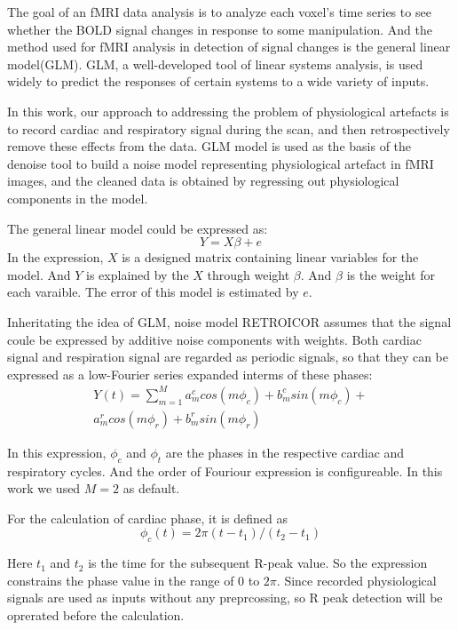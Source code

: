 The goal of an fMRI data analysis is to analyze each voxel's time series to see whether the BOLD signal changes in response to some manipulation.\cite{poldrack2011handbook} 
And the method used for fMRI analysis in detection of signal changes is the general linear model(GLM). 
GLM, a well-developed tool of linear systems analysis, is used widely to predict the responses of certain systems to a wide variety of inputs.\cite{cohen1997parametric}

In this work, our approach to addressing the problem of physiological artefacts is to record cardiac and respiratory signal during the scan, and then retrospectively remove these effects from the data.\cite{glover2000image} 
GLM model is used as the basis of the denoise tool to build a noise model representing physiological artefact in fMRI images, and the cleaned data is obtained by regressing out physiological components in the model.

The general linear model could be expressed as:
\begin{equation}
    Y = X\beta + e
\end{equation}
In the expression, $X$ is a designed matrix containing linear variables for the model. And $Y$ is explained by the $X$ through weight $\beta$. And $\beta$ is the weight for each varaible. The error of this model is estimated by $e$.

Inheritating the idea of GLM, noise model RETROICOR assumes that the signal coule be expressed by additive noise components with weights. Both cardiac signal and respiration signal are regarded as periodic signals, so that they can be expressed as a low-Fourier series expanded interms of these phases:
\begin{multline}
    Y(t) = \sum_{m = 1}^{M} a_m^c cos(m\phi_c) + b_m^c sin(m\phi_c) + \\ a_m^r cos(m\phi_r) + b_m^r sin(m\phi_r)
\end{multline}

In this expression, $\phi_c$ and $\phi_t$ are the phases in the respective cardiac and respiratory cycles. 
And the order of Fouriour expression is configureable. In this work we used $M = 2$ as default.

For the calculation of cardiac phase, it is defined as
\begin{equation}
    \phi_c(t) = 2\pi(t-t_1)/(t_2-t_1)
\end{equation}

Here $t_1$ and $t_2$ is the time for the subsequent R-peak value. 
So the expression constrains the phase value in the range of $0$ to $2\pi$. 
Since recorded physiological signals are used as inputs without any preprcossing, so R peak detection will be oprerated before the calculation.

